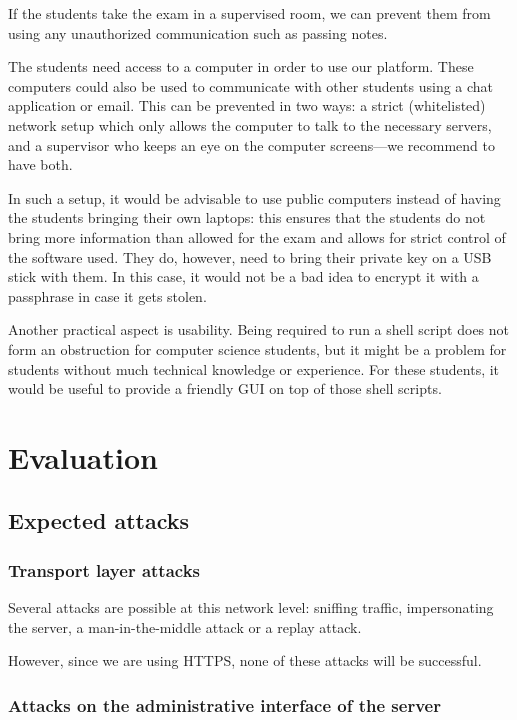 \documentclass[12pt]{article}
\begin{document}
If the students take the exam in a supervised room, we can prevent them from
using any unauthorized communication such as passing notes.

The students need access to a computer in order to use our platform. These
computers could also be used to communicate with other students using a chat
application or email. This can be prevented in two ways: a strict (whitelisted)
network setup which only allows the computer to talk to the necessary servers,
and a supervisor who keeps an eye on the computer screens---we recommend to have
both.

In such a setup, it would be advisable to use public computers instead of having
the students bringing their own laptops: this ensures that the students do not
bring more information than allowed for the exam and allows for strict control
of the software used. They do, however, need to bring their private key on a USB
stick with them. In this case, it would not be a bad idea to encrypt it with a
passphrase in case it gets stolen.

Another practical aspect is usability. Being required to run a shell script does
not form an obstruction for computer science students, but it might be a problem
for students without much technical knowledge or experience. For these students,
it would be useful to provide a friendly GUI on top of those shell scripts.

\section{Evaluation}
\subsection{Expected attacks}
\label{subsec:req-attacks}

\subsubsection{Transport layer attacks}

Several attacks are possible at this network level: sniffing traffic,
impersonating the server, a man-in-the-middle attack or a replay attack.

However, since we are using HTTPS, none of these attacks will be successful.

\subsubsection{Attacks on the administrative interface of the server}
\end{document}
